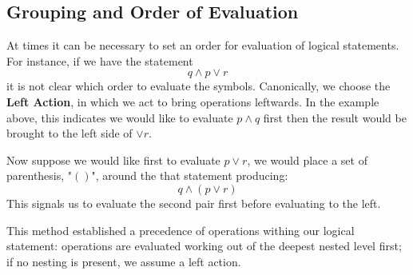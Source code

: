 \subsection{Grouping and Order of Evaluation}

At times it can be necessary to set an order for evaluation of logical statements.
For instance, if we have the statement $$ q \land p \lor r $$ it is not clear which order to evaluate the symbols.
Canonically, we choose the \textbf{Left Action}, in which we act to bring operations leftwards.
In the example above, this indicates we would like to evaluate $p \land q$ first then the result would be brought to the left side of $\lor r$.

Now suppose we would like first to evaluate $p \lor r$, we would place a set of parenthesis, "$()$", around the that statement producing:
$$ q \land (p \lor r) $$
This signals us to evaluate the second pair first before evaluating to the left.

This method established a precedence of operations withing our logical statement: operations are evaluated working out of the deepest nested level first; if no nesting is present, we assume a left action.

